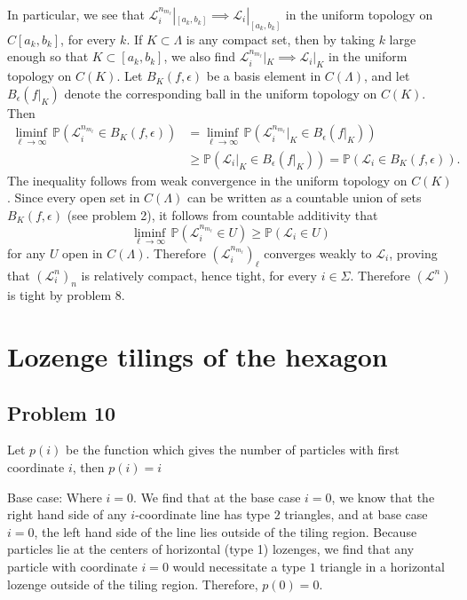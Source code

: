 \documentclass[12pt]{article}
\begin{document}
		In particular, we see that $\mathcal{L}_i^{n_{m_\ell}}|_{[a_k,b_k]} \implies \mathcal{L}_i|_{[a_k,b_k]}$ in the uniform topology on $C[a_k,b_k]$, for every $k$. If $K\subset\Lambda$ is any compact set, then by taking $k$ large enough so that $K\subset [a_k,b_k]$, we also find $\mathcal{L}_i^{n_{m_\ell}}|_K \implies \mathcal{L}_i|_K$ in the uniform topology on $C(K)$. Let $B_K(f,\epsilon)$ be a basis element in $C(\Lambda)$, and let $B_\epsilon(f|_K)$ denote the corresponding ball in the uniform topology on $C(K)$. Then
		\begin{align*}
		\liminf_{\ell\to\infty}\,\mathbb{P}(\mathcal{L}^{n_{m_\ell}}_i \in B_K(f,\epsilon)) &= \liminf_{\ell\to\infty}\,\mathbb{P}(\mathcal{L}^{n_{m_\ell}}_i|_K \in B_\epsilon(f|_K))\\
		& \geq \mathbb{P}(\mathcal{L}_i|_K \in B_\epsilon(f|_K)) = \mathbb{P}(\mathcal{L}_i \in B_K(f,\epsilon)).
		\end{align*}
		The inequality follows from weak convergence in the uniform topology on $C(K)$. Since every open set in $C(\Lambda)$ can be written as a countable union of sets $B_K(f,\epsilon)$ (see problem 2), it follows from countable additivity that
		\[
		\liminf_{\ell\to\infty}\,\mathbb{P}(\mathcal{L}^{n_{m_\ell}}_i \in U) \geq \mathbb{P}(\mathcal{L}_i \in U)
		\]
		for any $U$ open in $C(\Lambda)$. Therefore $(\mathcal{L}_i^{n_{m_\ell}})_\ell$ converges weakly to $\mathcal{L}_i$, proving that $(\mathcal{L}^n_i)_n$ is relatively compact, hence tight, for every $i\in\Sigma$. Therefore $(\mathcal{L}^n)$ is tight by problem 8.


\section{Lozenge tilings of the hexagon}

	\subsection*{Problem 10}
		Let $p(i)$ be the function which gives the number of particles with first coordinate $i$, then $p(i)=i$
		
		Base case: Where $i=0$. We find that at the base case $i=0$, we know that the right hand side of any $i$-coordinate line has type $2$ triangles, and at base case $i=0$,  the left hand side of the line lies outside of the tiling region. 
		Because particles lie at the centers of horizontal (type 1) lozenges, we find that any particle with coordinate $i=0$ would necessitate a type $1$ triangle in a horizontal lozenge outside of the tiling region. Therefore, $p(0)=0$.
		
\end{document}
